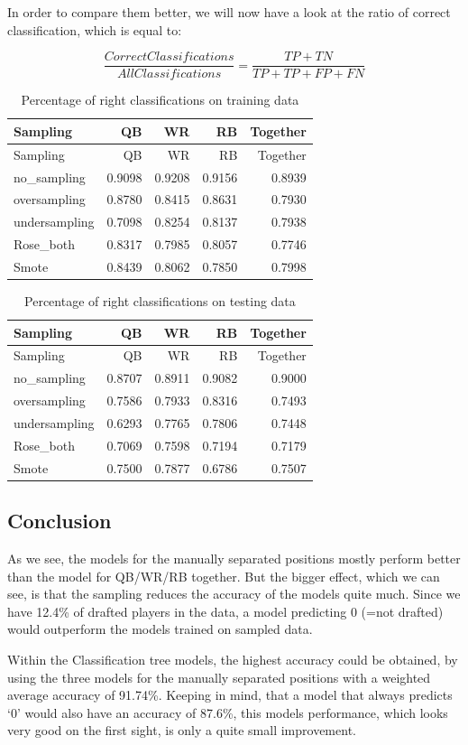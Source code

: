 \documentclass[]{article}
\begin{document}
In order to compare them better, we will now have a look at the ratio of
correct classification, which is equal to:

\[\frac{Correct Classifications}{All Classifications} = \frac{TP + TN}{TP+TP+FP+FN}\]

\begin{longtable}[]{@{}lrrrr@{}}
\caption{Percentage of right classifications on training
data}\tabularnewline
\toprule
Sampling & QB & WR & RB & Together\tabularnewline
\midrule
\endfirsthead
\toprule
Sampling & QB & WR & RB & Together\tabularnewline
\midrule
\endhead
no\_sampling & 0.9098 & 0.9208 & 0.9156 & 0.8939\tabularnewline
oversampling & 0.8780 & 0.8415 & 0.8631 & 0.7930\tabularnewline
undersampling & 0.7098 & 0.8254 & 0.8137 & 0.7938\tabularnewline
Rose\_both & 0.8317 & 0.7985 & 0.8057 & 0.7746\tabularnewline
Smote & 0.8439 & 0.8062 & 0.7850 & 0.7998\tabularnewline
\bottomrule
\end{longtable}

\newpage

\begin{longtable}[]{@{}lrrrr@{}}
\caption{Percentage of right classifications on testing
data}\tabularnewline
\toprule
Sampling & QB & WR & RB & Together\tabularnewline
\midrule
\endfirsthead
\toprule
Sampling & QB & WR & RB & Together\tabularnewline
\midrule
\endhead
no\_sampling & 0.8707 & 0.8911 & 0.9082 & 0.9000\tabularnewline
oversampling & 0.7586 & 0.7933 & 0.8316 & 0.7493\tabularnewline
undersampling & 0.6293 & 0.7765 & 0.7806 & 0.7448\tabularnewline
Rose\_both & 0.7069 & 0.7598 & 0.7194 & 0.7179\tabularnewline
Smote & 0.7500 & 0.7877 & 0.6786 & 0.7507\tabularnewline
\bottomrule
\end{longtable}

\hypertarget{conclusion}{%
\subsection{Conclusion}\label{conclusion}}

As we see, the models for the manually separated positions mostly
perform better than the model for QB/WR/RB together. But the bigger
effect, which we can see, is that the sampling reduces the accuracy of
the models quite much. Since we have 12.4\% of drafted players in the
data, a model predicting 0 (=not drafted) would outperform the models
trained on sampled data.

Within the Classification tree models, the highest accuracy could be
obtained, by using the three models for the manually separated positions
with a weighted average accuracy of 91.74\%. Keeping in mind, that a
model that always predicts `0' would also have an accuracy of 87.6\%,
this models performance, which looks very good on the first sight, is
only a quite small improvement.
\end{document}
